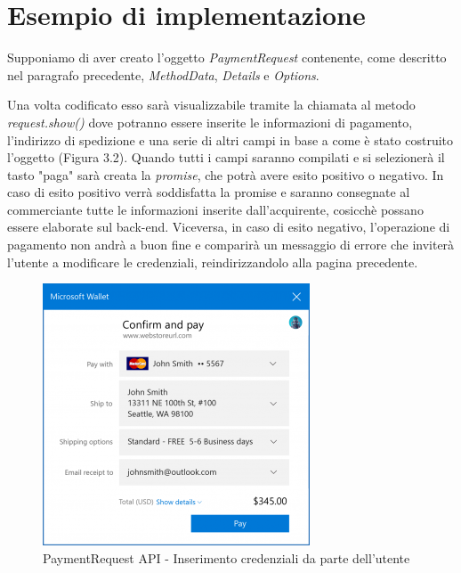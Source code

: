 \documentclass[12pt ,a4paper , twoside , openright ]{book}
\begin{document}
	\section{Esempio di implementazione}
	Supponiamo di aver creato l'oggetto \textit{PaymentRequest} contenente, come descritto nel paragrafo precedente, \textit{MethodData}, \textit{Details} e \textit{Options}. 
	
	Una volta codificato esso sarà visualizzabile tramite la chiamata al metodo \textit{request.show()} dove potranno essere inserite le informazioni di pagamento, l'indirizzo di spedizione e una serie di altri campi in base a come è stato costruito l'oggetto (Figura 3.2). Quando tutti i campi saranno compilati e si selezionerà il tasto "paga" sarà creata la \textit{promise}, che potrà avere esito positivo o negativo. In caso di esito positivo verrà soddisfatta la promise e saranno consegnate al commerciante tutte le informazioni inserite dall'acquirente, cosicchè possano essere elaborate sul back-end. Viceversa, in caso di esito negativo, l'operazione di pagamento non andrà a buon fine e comparirà un messaggio di errore che inviterà l'utente a modificare le credenziali, reindirizzandolo alla pagina precedente.
	\begin{figure}[h]
		\centering
		\includegraphics[width=0.5\linewidth]{wallet1}
		\caption{PaymentRequest API - Inserimento credenziali da parte dell'utente\cite{rif30}}
		\label{fig: PaymentRequest API - Inserimento credenziali da parte dell'utente}
	\end{figure} 
\end{document}
